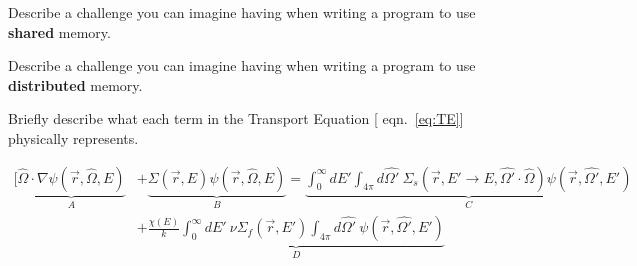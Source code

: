 \documentclass[12pt]{exam}
\newcommand{\Macro}{\ensuremath{\Sigma}}
\begin{document}
\begin{questions}

\addpoints
\question 
{}

\vspace*{2em}
\addpoints
\question 
{}

\vspace*{2em}
\addpoints
\question[10] Describe a challenge you can imagine having when writing a program to use \textbf{shared} memory.

\vspace*{2em}
\addpoints
\question[10] Describe a challenge you can imagine having when writing a program to use \textbf{distributed} memory.

\vspace*{2em}
\addpoints
\question[20] Briefly describe what each term in the Transport Equation [ eqn.~\eqref{eq:TE}] physically represents.

\begin{align}
[\underbrace{\hat{\Omega} \cdot \nabla\psi(\vec{r}, \hat{\Omega}, E)}_A &+
%
 \underbrace{\Macro(\vec{r}, E)\psi(\vec{r}, \hat{\Omega}, E)}_B   = 
%
 \underbrace{\int_0^{\infty} dE' \int_{4\pi} d\hat{\Omega'} \:\Macro_{s}(\vec{r}, E' \to E, \hat{\Omega'} \cdot \hat{\Omega}) \psi(\vec{r}, \hat{\Omega'}, E')}_C \nonumber \\
%
&+\underbrace{\frac{ \chi(E)}{k} \int_0^{\infty} dE' \:\nu \Macro_{f}(\vec{r}, E') \int_{4\pi} d\hat{\Omega'} \:\psi(\vec{r}, \hat{\Omega'}, E')}_D
\label{eq:TE}
\end{align}


\end{questions}
\end{document}
